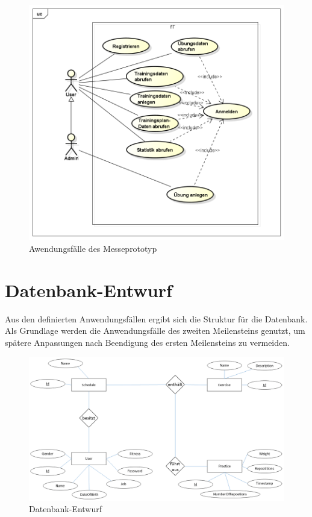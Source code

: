 \begin{figure}[h]
\centering
\includegraphics[width=0.8\linewidth]{content/images/UseCase-Messeprototyp.png}
\caption{Awendungsfälle des Messeprototyp}
\label{pic:usecase-messe}
\end{figure}
\newpage
\section{Datenbank-Entwurf}
\label{sec:Datenbank-Entwurf}
Aus den definierten Anwendungsfällen ergibt sich die Struktur für die Datenbank. Als Grundlage werden die Anwendungsfälle des zweiten Meilensteins genutzt, um spätere Anpassungen nach Beendigung des ersten Meilensteins zu vermeiden.

\begin{figure}[h]
\centering
\includegraphics[width=0.8\linewidth]{content/images/DB-Entwurf.png}
\caption{Datenbank-Entwurf}
\label{pic:db-entwurf}
\end{figure}

